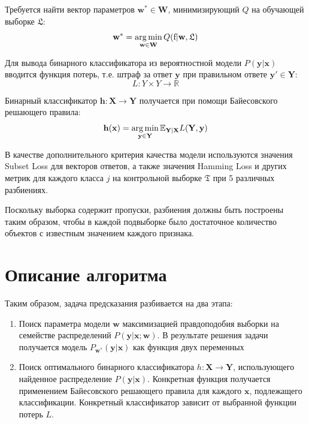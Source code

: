 \documentclass[12pt,twoside]{article}
\newcommand{\x}{\mathbf{x}}
\newcommand{\h}{\mathbf{h}}
\newcommand{\w}{\mathbf{w}}
\newcommand{\W}{\mathbf{W}}
\newcommand{\y}{\mathbf{y}}
\newcommand{\X}{\mathbf{X}}
\newcommand{\Y}{\mathbf{Y}}
\newcommand{\fs}{\mbox{f}}
\begin{document}
%

Требуется найти вектор параметров $\w^*\in\W$, минимизирующий $Q$ на обучающей выборке $\mathfrak{L}$:
	$$\w^*=\argmin_{\w\in\W}Q(\fs|\w,\mathfrak{L})$$

Для вывода бинарного классификатора из вероятностной модели $P(\y|\x)$ вводится функция потерь, т.е. штраф за ответ $\y$ при правильном ответе $\y'\in\Y$:
$$L\colon Y\times Y\to \mathbb{R}$$

Бинарный классификатор $\h\colon\X\to\Y$ получается \cite{weiwei2010} при помощи Байесовского решающего правила:
$$\h(\x)=\argmin\limits_{\y\in\Y}\mathbb{E}_{\Y|\X}L(\Y,\y)$$

В качестве дополнительного критерия качества модели используются значения Subset Loss для векторов ответов, а также значения Hamming Loss и других метрик для каждого класса $j$ на контрольной выборке $\mathfrak{T}$ при 5 различных разбиениях.


Поскольку выборка содержит пропуски, разбиения должны быть построены таким образом, чтобы в каждой подвыборке было достаточное количество объектов с известным значением каждого признака.

\section{Описание алгоритма}
Таким образом, задача предсказания разбивается на два этапа:
\begin{enumerate}
\item Поиск параметра модели $\w$ максимизацией правдоподобия выборки на семействе распределений $P(\y|\x;\w)$. В результате решения задачи получается модель $P_{\w^*}(\y|\x)$ как функция двух переменных
\item Поиск оптимального бинарного классификатора $h\colon \X\to\Y$, использующего найденное распределение $P(\y|\x)$. Конкретная функция получается применением Байесовского решающего правила для каждого $\x$, подлежащего классификации. Конкретный классификатор зависит от выбранной функции потерь $L$.
\end{enumerate}
\end{document}

